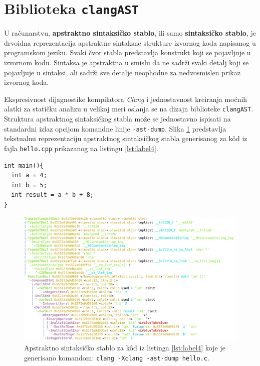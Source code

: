\documentclass[12pt,oneside]{memoir}
\begin{document}

\section{Biblioteka \texttt{clangAST}}
\label{sec:clangASTSec}
U računarstvu, \textbf{apstraktno sintaksi\v{c}ko stablo}, ili samo \textbf{sintaksi\v{c}ko stablo}, je drvoidna reprezentacija apstraktne sintaksne strukture izvornog koda napisanog u programskom jeziku. Svaki čvor stabla predstavlja konstrukt koji se pojavljuje u izvornom kodu.
Sintaksa je apstraktna u smislu da ne sadr\v{z}i svaki detalj koji se pojavljuje u sintaksi, ali sadr\v{z}i sve detalje neophodne za nedvosmislen prikaz izvornog koda.

Ekspresivnost dijagnostike kompilatora \textit{Clang} i jednostavnost kreiranja mo\'{c}nih alatki za stati\v{c}ku analizu u velikoj meri oslanja se na dizajn biblioteke \texttt{clangAST}. Struktura apstraktnog sintaksi\v{c}kog stabla mo\v{z}e se jednostavno ispisati na standardni izlaz opcijom komandne linije \texttt{-ast-dump}. Slika \ref{fig:ASTSlika} predstavlja tekstualnu reprezentaciju apstraktnog sintaksi\v{c}kog stabla generisanog za k\^{o}d iz fajla \texttt{hello.cpp} prikazanog na listingu \ref{lst:label4}.
\\

\begin{lstlisting}[style=customc, caption={K\^{o}d \v{c}ije je apstraktno sintaksi\v{c}ko stablo prikazano na slici \ref{fig:ASTSlika}.},label=lst:label4]
int main(){
  int a = 4;
  int b = 5;
  int result = a * b + 8;
}
\end{lstlisting}

\begin{figure}[!ht]
  \centering
  \includegraphics[width=1.0\textwidth]{ASTImage.png}
  \caption{Apstraktno sintaksi\v{c}ko stablo za k\^{o}d iz listinga \ref{lst:label4} koje je generisano komandom: \texttt{clang -Xclang -ast-dump hello.c}.}
  \label{fig:ASTSlika}
\end{figure}
\end{document}
